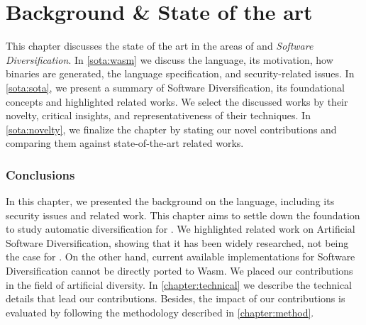 \chapter{Background \& State of the art}
\label{chapter:sota}

This chapter discusses the state of the art in the areas of \emph{\wasm} and \emph{Software Diversification}. In \autoref{sota:wasm} we discuss the \wasm language, its motivation, how \wasm binaries are generated, the language specification, and security-related issues. In \autoref{sota:sota}, we present a summary of Software Diversification, its foundational concepts and highlighted related works.  
We select the discussed works by their novelty, critical insights, and representativeness of their techniques. 
In \autoref{sota:novelty}, we finalize the chapter by stating our novel contributions and comparing them against state-of-the-art related works.







\subsection*{Conclusions}
In this chapter, we presented the background on the \wasm language, including its security issues and related work.
This chapter aims to settle down the foundation to study automatic diversification for \wasm. 
We highlighted related work on Artificial Software Diversification, showing that it has been widely researched, not being the case for \wasm. 
On the other hand, current available implementations for Software Diversification  cannot be directly ported to Wasm. 
We placed our contributions in the field of artificial diversity. 
In \autoref{chapter:technical} we describe the technical details that lead our contributions. 
Besides, the impact of our contributions is evaluated by following the methodology described in \autoref{chapter:method}.
